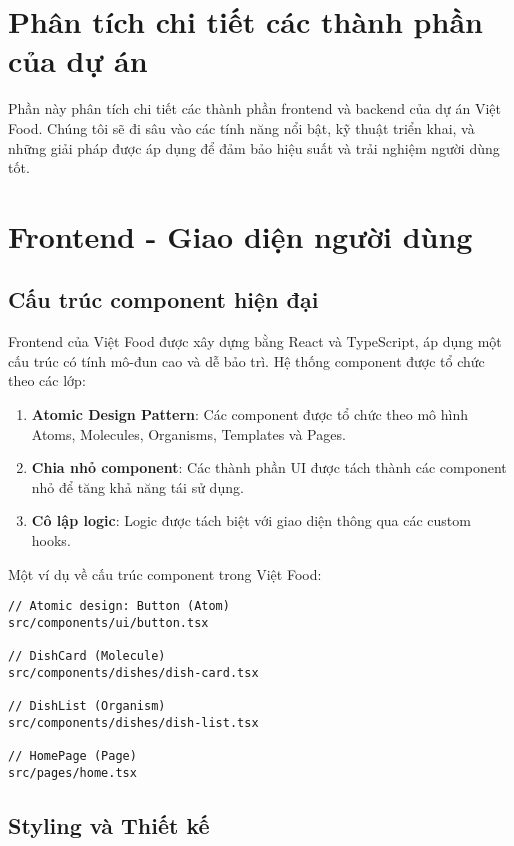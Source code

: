 \section{Phân tích chi tiết các thành phần của dự án}

Phần này phân tích chi tiết các thành phần frontend và backend của dự án Việt Food. Chúng tôi sẽ đi sâu vào các tính năng nổi bật, kỹ thuật triển khai, và những giải pháp được áp dụng để đảm bảo hiệu suất và trải nghiệm người dùng tốt.

\section{Frontend - Giao diện người dùng}

\subsection{Cấu trúc component hiện đại}

Frontend của Việt Food được xây dựng bằng React và TypeScript, áp dụng một cấu trúc có tính mô-đun cao và dễ bảo trì. Hệ thống component được tổ chức theo các lớp:

\begin{enumerate}
    \item \textbf{Atomic Design Pattern}: Các component được tổ chức theo mô hình Atoms, Molecules, Organisms, Templates và Pages.
    \item \textbf{Chia nhỏ component}: Các thành phần UI được tách thành các component nhỏ để tăng khả năng tái sử dụng.
    \item \textbf{Cô lập logic}: Logic được tách biệt với giao diện thông qua các custom hooks.
\end{enumerate}

Một ví dụ về cấu trúc component trong Việt Food:

\begin{verbatim}
// Atomic design: Button (Atom)
src/components/ui/button.tsx

// DishCard (Molecule)
src/components/dishes/dish-card.tsx

// DishList (Organism)
src/components/dishes/dish-list.tsx

// HomePage (Page)
src/pages/home.tsx
\end{verbatim}

\subsection{Styling và Thiết kế}

